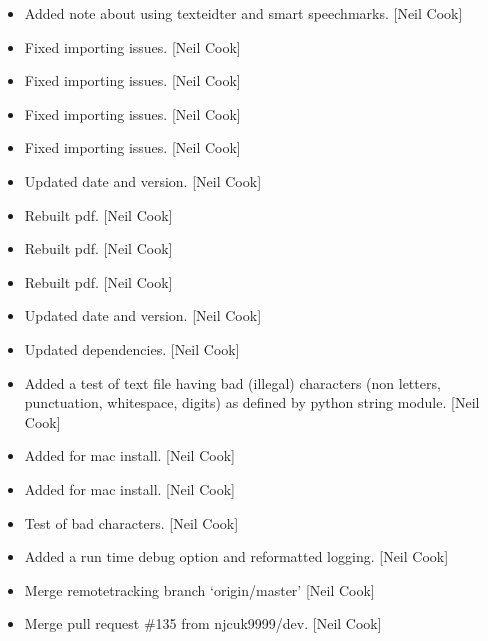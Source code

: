 \documentclass[a4paper,10pt,english]{report}
\begin{document}
\label{\detokenize{misc/changelog:id495}}\begin{itemize}
\item {} 
Added note about using texteidter and smart speechmarks. {[}Neil Cook{]}

\item {} 
Fixed importing issues. {[}Neil Cook{]}

\item {} 
Fixed importing issues. {[}Neil Cook{]}

\item {} 
Fixed importing issues. {[}Neil Cook{]}

\item {} 
Fixed importing issues. {[}Neil Cook{]}

\item {} 
Updated date and version. {[}Neil Cook{]}

\item {} 
Rebuilt pdf. {[}Neil Cook{]}

\item {} 
Rebuilt pdf. {[}Neil Cook{]}

\item {} 
Rebuilt pdf. {[}Neil Cook{]}

\item {} 
Updated date and version. {[}Neil Cook{]}

\item {} 
Updated dependencies. {[}Neil Cook{]}

\item {} 
Added a test of text file having bad (illegal) characters (non
letters, punctuation, whitespace, digits) as defined by python string
module. {[}Neil Cook{]}

\item {} 
Added  for mac install. {[}Neil Cook{]}

\item {} 
Added  for mac install. {[}Neil Cook{]}

\item {} 
Test of bad characters. {[}Neil Cook{]}

\item {} 
Added a run time debug option and reformatted logging. {[}Neil Cook{]}

\item {} 
Merge remote\sphinxhyphen{}tracking branch ‘origin/master’ {[}Neil Cook{]}

\item {} 
Merge pull request \#135 from njcuk9999/dev. {[}Neil Cook{]}


\end{itemize}
\end{document}
